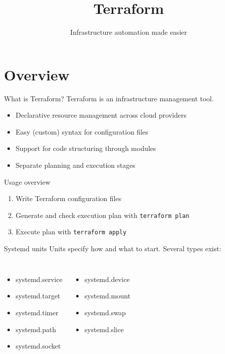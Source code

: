 \documentclass[12pt]{beamer}
\title{Terraform}
\subtitle{Infrastructure automation made easier}
\newenvironment{code}{\ttfamily}{\par}
\begin{document}

\maketitle

\section{Overview}

\begin{frame}{What is Terraform?}
  Terraform is an infrastructure management tool.
  \begin{itemize}
  \item Declarative resource management across cloud providers
  \item Easy (custom) syntax for configuration files
  \item Support for code structuring through modules
  \item Separate planning and execution stages
  \end{itemize}
\end{frame}

\begin{frame}{Usage overview}
  \begin{enumerate}
  \item Write Terraform configuration files
  \item Generate and check execution plan with \texttt{terraform plan}
  \item Execute plan with \texttt{terraform apply}
  \end{enumerate}
\end{frame}

\begin{frame}{Systemd units}
  Units specify how and what to start. Several types exist:
  \begin{code}
    \small
    \begin{columns}[T,onlytextwidth]
      \begin{itemize}
      \item systemd.service
      \item systemd.target
      \item systemd.timer
      \item systemd.path
      \item systemd.socket
      \end{itemize}
      \begin{itemize}
      \item systemd.device
      \item systemd.mount
      \item systemd.swap
      \item systemd.slice
      \end{itemize}
    \end{columns}
  \end{code}
\end{frame}
\end{document}
